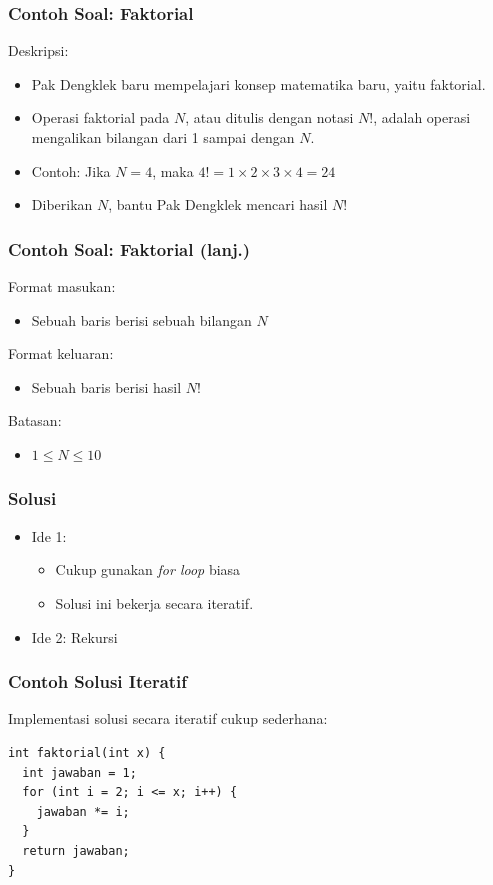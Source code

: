 \begin{frame}
\frametitle{Contoh Soal: Faktorial}
Deskripsi:
\begin{itemize}
  \item Pak Dengklek baru mempelajari konsep matematika baru, yaitu faktorial.
  \item Operasi faktorial pada $N$, atau ditulis dengan notasi $N$!, adalah operasi mengalikan bilangan dari 1 sampai dengan $N$.
  \item Contoh: Jika $N = 4$, maka $4! = 1 \times 2 \times 3 \times 4 = 24$
  \item Diberikan $N$, bantu Pak Dengklek mencari hasil $N$!
\end{itemize}
\end{frame}

\begin{frame}
\frametitle{Contoh Soal: Faktorial (lanj.) }
Format masukan:
\begin{itemize}
  \item Sebuah baris berisi sebuah bilangan $N$
\end{itemize}
Format keluaran:
\begin{itemize}
  \item Sebuah baris berisi hasil $N$!
\end{itemize}
Batasan:
\begin{itemize}
  \item $1 \le N \le 10$
\end{itemize}
\end{frame}

\begin{frame}
\frametitle{Solusi}
\begin{itemize}
  \item Ide 1:
  \begin{itemize}
    \item Cukup gunakan \textit{for loop} biasa
    \item Solusi ini bekerja secara iteratif.
  \end{itemize}
  \item Ide 2: Rekursi 
\end{itemize}
\end{frame}

\begin{frame}[fragile]
\frametitle{Contoh Solusi Iteratif}
Implementasi solusi secara iteratif cukup sederhana:
\begin{lstlisting}    
int faktorial(int x) {
  int jawaban = 1;
  for (int i = 2; i <= x; i++) {
    jawaban *= i;
  }
  return jawaban;
}
\end{lstlisting}
\end{frame}

